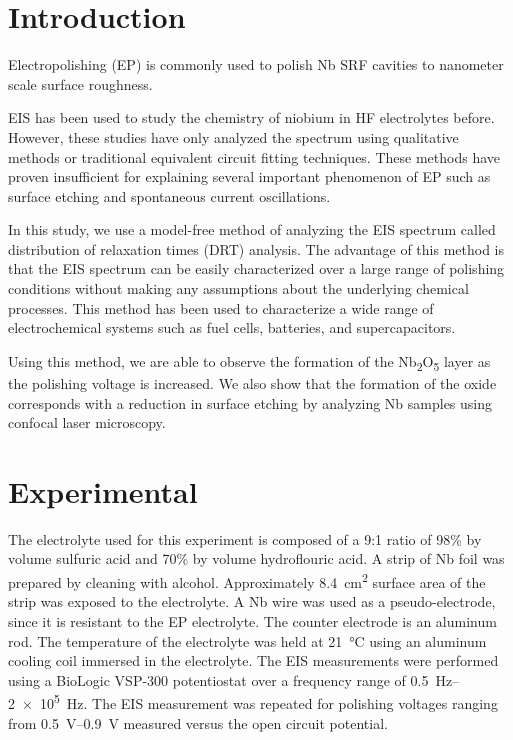 \section{Introduction}
\label{sec:org5ef967f}
Electropolishing (EP) is commonly used to polish Nb SRF cavities to nanometer scale surface roughness. 

EIS has been used to study the chemistry of niobium in HF electrolytes before.\cite{cattarin2002nb,Tian_2008, tian2008novel, ranjith2018anodic} However, these studies have only analyzed the spectrum using qualitative methods or traditional equivalent circuit fitting techniques. These methods have proven insufficient for explaining several important phenomenon of EP such as surface etching and spontaneous current oscillations.

In this study, we use a model-free method of analyzing the EIS spectrum called distribution of relaxation times (DRT) analysis. The advantage of this method is that the EIS spectrum can be easily characterized over a large range of polishing conditions without making any assumptions about the underlying chemical processes.\cite{10.1063/1.1745355, wan2015influence, ZHANG2015464} This method has been used to characterize a wide range of electrochemical systems such as fuel cells,\cite{Sonn_2008, schichlein2002deconvolution, Leonide_2008} batteries,\cite{SCHMIDT201370, batteries5020043, SONI202297} and supercapacitors.\cite{HELSETH2019100912}

Using this method, we are able to observe the formation of the Nb\textsubscript{2}O\textsubscript{5} layer as the polishing voltage is increased. We also show that the formation of the oxide corresponds with a reduction in surface etching by analyzing Nb samples using confocal laser microscopy.


\section{Experimental}
\label{sec:orgb71f960}

The electrolyte used for this experiment is composed of a 9:1 ratio of 98\% by volume sulfuric acid and 70\% by volume hydroflouric acid. A strip of Nb foil was prepared by cleaning with alcohol. Approximately \qty{8.4}{\centi\meter\squared} surface area of the strip was exposed to the electrolyte. A Nb wire was used as a pseudo-electrode, since it is resistant to the EP electrolyte. The counter electrode is an aluminum rod. The temperature of the electrolyte was held at \qty{21}{\celsius} using an aluminum cooling coil immersed in the electrolyte. The EIS measurements were performed using a BioLogic VSP-300 potentiostat over a frequency range of \qtyrange{0.5}{2e5}{\hertz}. The EIS measurement was repeated for polishing voltages ranging from \qtyrange{0.5}{0.9}{\volt} measured versus the open circuit potential.

